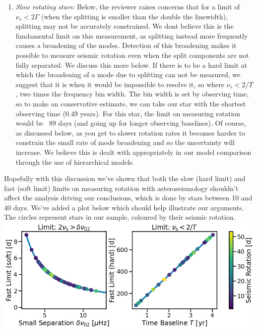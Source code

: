 \documentclass[11pt]{article}
\begin{document}
\begin{enumerate}
\item \textit{Slow rotating stars:} Below, the reviewer raises concerns that for a limit of $\nu_s < 2\Gamma$ (when the splitting is smaller than the double the linewidth), splitting may not be accurately constrained. We dont believe this is the fundamental limit on this measurement, as splitting instead more frequently causes a broadening of the modes. Detection of this broadening makes it possible to measure seismic rotation even when the split components are not fully separated. We discuss this more below. If there is to be a hard limit at which the broadening of a mode due to splitting can not be measured, we suggest that it is when it would be impossible to resolve it, so where $\nu_s < 2/T$, two times the frequency bin width. The bin width is set by observing time, so to make an conservative estimate, we can take our star with the shortest observing time  (0.49 years). For this star, the limit on measuring rotation would be ~89 days (and going up for longer observing baselines). Of course, as discussed below, as you get to slower rotation rates it becomes harder to constrain the small rate of mode broadening and so the uncertainty will increase. We believe this is dealt with appropriately in our model comparison through the use of hierarchical models.
\end{enumerate}

Hopefully with this discussion we’ve shown that both the slow (hard limit) and fast (soft limit) limits on measuring rotation with asteroseismology shouldn’t affect the analysis driving our conclusions, which is done by stars between 10 and 40 days. We’ve added a plot below which should help illustrate our arguments. The circles represent stars in our sample, coloured by their seismic rotation.\\

\includegraphics[width=\textwidth]{image1.png}
\end{document}
